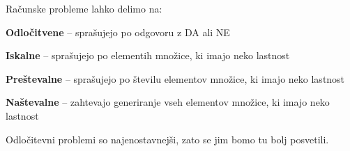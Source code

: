 \documentclass[10pt,a4paper,oneside]{book}
\begin{document}
Računske probleme lahko delimo na:
\begin{items}
\item \textbf{Odločitvene} -- sprašujejo po odgovoru z DA ali NE %
\item \textbf{Iskalne} -- sprašujejo po elementih množice, ki imajo neko lastnost
\item \textbf{Preštevalne} -- sprašujejo po številu elementov množice, ki imajo neko lastnost
\item \textbf{Naštevalne} -- zahtevajo generiranje vseh elementov množice, ki imajo neko lastnost
\end{items}
Odločitevni problemi so najenostavnejši, zato se jim bomo tu bolj posvetili.
\end{document}
